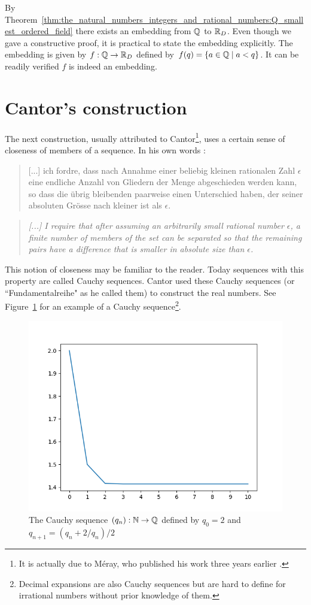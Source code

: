 \documentclass[../main.tex]{subfiles}
\begin{document}
By Theorem~\ref{thm:the_natural_numbers_integers_and_rational_numbers:Q_smallest_ordered_field} there exists an embedding from $\mathbb{Q}$ to $\mathbb{R}_D$. Even though we gave a constructive proof, it is practical to state the embedding explicitly. The embedding is given by $f:\mathbb{Q}\to\mathbb{R}_D$ defined by $f(q)=\{a\in\mathbb{Q}\mid a<q\}$. It can be readily verified $f$ is indeed an embedding.

\section{Cantor's construction}\label{sec:the_real_numbers:cantors_construction}
The next construction, usually attributed to Cantor\footnote{It is actually due to Méray, who published his work three years earlier \cite{Meray1869}.}, uses a certain sense of closeness of members of a sequence. In his own words \cite{Cantor1883}:
\begin{quote}
    \textgerman{[...] ich fordre, dass nach Annahme einer beliebig kleinen rationalen Zahl $\epsilon$ eine endliche Anzahl von Gliedern der Menge abgeschieden werden kann, so dass die übrig bleibenden paarweise einen Unterschied haben, der seiner absoluten Grösse nach kleiner ist als $\epsilon$.}
\end{quote}
\begin{quote}
    \textit{[...] I require that after assuming an arbitrarily small rational number $\epsilon$, a finite number of members of the set can be separated so that the remaining pairs have a difference that is smaller in absolute size than $\epsilon$.}
\end{quote}
This notion of closeness may be familiar to the reader. Today sequences with this property are called Cauchy sequences. Cantor used these Cauchy sequences (or ``\textgerman{Fundamentalreihe}" as he called them) to construct the real numbers. See Figure~\ref{fig:the_real_numbers:cauchy_sequence} for an example of a Cauchy sequence\footnote{Decimal expansions are also Cauchy sequences but are hard to define for irrational numbers without prior knowledge of them.}.
\begin{figure}[!htbp]
    \centering
    \includegraphics[width=0.75\linewidth]{figures/cauchy_sequence.png}
    \caption{The Cauchy sequence $(q_n):\mathbb{N}\to\mathbb{Q}$ defined by $q_0=2$ and $q_{n+1}=(q_n+2/q_n)/2$}
    \label{fig:the_real_numbers:cauchy_sequence}
\end{figure}
\end{document}
